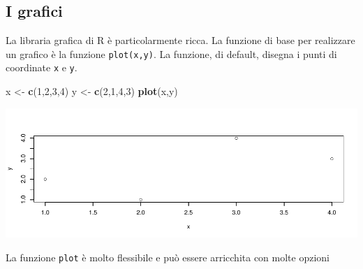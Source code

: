 \documentclass[
  11pt,
]{book}
\newenvironment{Shaded}{\begin{snugshade}}{\end{snugshade}}
\newcommand{\DecValTok}[1]{\textcolor[rgb]{0.00,0.00,0.81}{#1}}
\newcommand{\FunctionTok}[1]{\textcolor[rgb]{0.13,0.29,0.53}{\textbf{#1}}}
\newcommand{\NormalTok}[1]{#1}
\newcommand{\OtherTok}[1]{\textcolor[rgb]{0.56,0.35,0.01}{#1}}
\theoremstyle{mytheoremstyle}
\theoremstyle{mydefstyle}
\begin{document}
\subsection{I grafici}\label{i-grafici}

La libraria grafica di R è particolarmente ricca. La funzione di base per
realizzare un grafico è la funzione \texttt{plot(x,y)}. La funzione, di default, disegna
i punti di coordinate \texttt{x} e \texttt{y}.

\begin{Shaded}
\begin{Highlighting}[]
\NormalTok{x }\OtherTok{\textless{}{-}} \FunctionTok{c}\NormalTok{(}\DecValTok{1}\NormalTok{,}\DecValTok{2}\NormalTok{,}\DecValTok{3}\NormalTok{,}\DecValTok{4}\NormalTok{)}
\NormalTok{y }\OtherTok{\textless{}{-}} \FunctionTok{c}\NormalTok{(}\DecValTok{2}\NormalTok{,}\DecValTok{1}\NormalTok{,}\DecValTok{4}\NormalTok{,}\DecValTok{3}\NormalTok{)}
\FunctionTok{plot}\NormalTok{(x,y)}
\end{Highlighting}
\end{Shaded}

\begin{center}\includegraphics{Appunti_di_Statistica_2025_files/figure-latex/24-Libro-24,-1} \end{center}

La funzione \texttt{plot} è molto flessibile e può essere arricchita con molte opzioni
\end{document}
